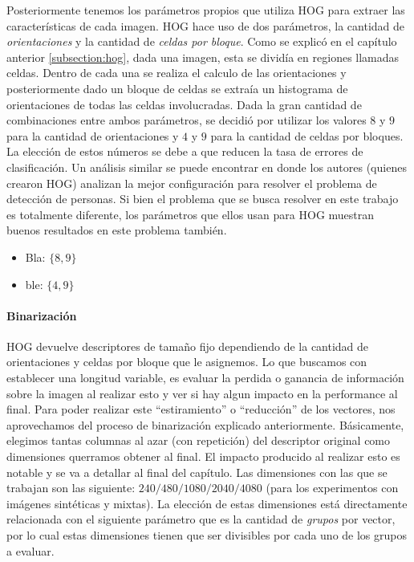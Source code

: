 	Posteriormente tenemos los parámetros propios que utiliza HOG para extraer las características de cada imagen. HOG hace uso de dos parámetros, la cantidad de \textit{orientaciones} y la cantidad de \textit{celdas por bloque}. Como se explicó en el capítulo anterior \ref{subsection:hog}, dada una imagen, esta se dividía en regiones llamadas celdas. Dentro de cada una se realiza el calculo de las orientaciones y posteriormente dado un bloque de celdas se extraía un histograma de orientaciones de todas las celdas involucradas. Dada la gran cantidad de combinaciones entre ambos parámetros, se decidió por utilizar los valores $8$ y $9$ para la cantidad de orientaciones y $4$ y $9$ para la cantidad de celdas por bloques. La elección de estos números se debe a que reducen la tasa de errores de clasificación. Un análisis similar se puede encontrar en \cite{DT05} donde los autores (quienes crearon HOG) analizan la mejor configuración para resolver el problema de detección de personas. Si bien el problema que se busca resolver en este trabajo es totalmente diferente, los parámetros que ellos usan para HOG muestran buenos resultados en este problema también.

	\begin{itemize}
		\item Bla: $\{8, 9\}$
		\item ble: $\{4, 9\}$
	\end{itemize}

	\paragraph{Binarización}

	HOG devuelve descriptores de tamaño fijo dependiendo de la cantidad de orientaciones y celdas por bloque que le asignemos. Lo que buscamos con establecer una longitud variable, es evaluar la perdida o ganancia de información sobre la imagen al realizar esto y ver si hay algun impacto en la performance al final. Para poder realizar este ``estiramiento'' o ``reducción'' de los vectores, nos aprovechamos del proceso de binarización explicado anteriormente. Básicamente, elegimos tantas columnas al azar (con repetición) del descriptor original como dimensiones querramos obtener al final. El impacto producido al realizar esto es notable y se va a detallar al final del capítulo. Las dimensiones con las que se trabajan son las siguiente: $240/480/1080/2040/4080$ (para los experimentos con imágenes sintéticas y mixtas). La elección de estas dimensiones está directamente relacionada con el siguiente parámetro que es la cantidad de \textit{grupos} por vector, por lo cual estas dimensiones tienen que ser divisibles por cada uno de los grupos a evaluar.

